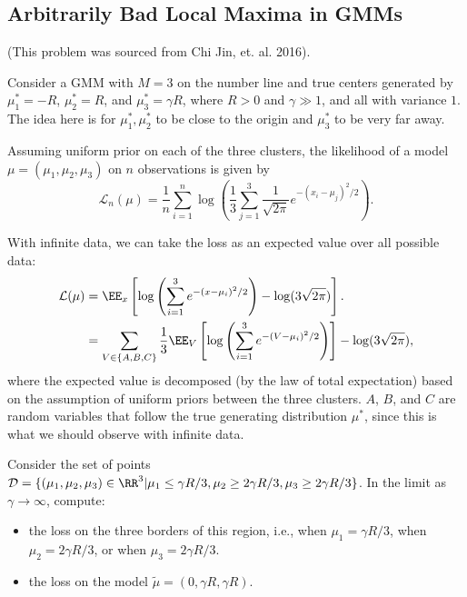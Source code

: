 \subsection{Arbitrarily Bad Local Maxima in GMMs}

(This problem was sourced from Chi Jin, et. al. 2016).

Consider a GMM with $M=3$ on the number line and true centers generated by $\mu_1^*=-R$, $\mu_2^*=R$, and $\mu_3^*=\gamma R$, where $R>0$ and $\gamma \gg 1$, and all with variance $1$. The idea here is for $\mu_1^*,\mu_2^*$ to be close to the origin and $\mu_3^*$ to be very far away.

Assuming uniform prior on each of the three clusters, the likelihood of a model $\mu = (\mu_1, \mu_2, \mu_3)$ on $n$ observations is given by
\[\mathcal{L}_n(\mu) = \frac{1}{n}\sum_{i=1}^n \log\left(\frac{1}{3}\sum_{j=1}^3 \frac{1}{\sqrt{2\pi}}e^{-(x_i - \mu_j)^2/2}\right).\] 

With infinite data, we can take the loss as an expected value over all possible data: 
\begin{align*}
	\mathcal{L}(\mu) &= \EE_x\left[\log\left(\sum_{i=1}^3e^{-(x-\mu_i)^2/2}\right) - \log(3\sqrt{2\pi})\right]. \\
									 &= \sum_{V\in \{A,B,C\}}\frac{1}{3}\EE_V\left[\log\left(\sum_{i=1}^3 e^{-(V-\mu_i)^2/2}\right)\right] - \log(3\sqrt{2\pi}), 
\end{align*}
where the expected value is decomposed (by the law of total expectation) based on the assumption of uniform priors between the three clusters. $A$, $B$, and $C$ are random variables that follow the true generating distribution $\mu^*$, since this is what we should observe with infinite data.

\begin{example}
\exlabel

Consider the set of points $\mathcal{D} = \{(\mu_1,\mu_2,\mu_3)\in \RR^3 | \mu_1\leq \gamma R/3, \mu_2 \geq 2\gamma R/3, \mu_3 \geq 2\gamma R / 3\}$. In the limit as $\gamma\rightarrow \infty$, compute: 
\begin{itemize}
	\item the loss on the three borders of this region, i.e., when $\mu_1=\gamma R/3$, when $\mu_2 = 2\gamma R/3$, or when $\mu_3 = 2\gamma R / 3$.
	\item the loss on the model $\tilde{\mu} = (0, \gamma R, \gamma R)$. 
\end{itemize}
\end{example}

